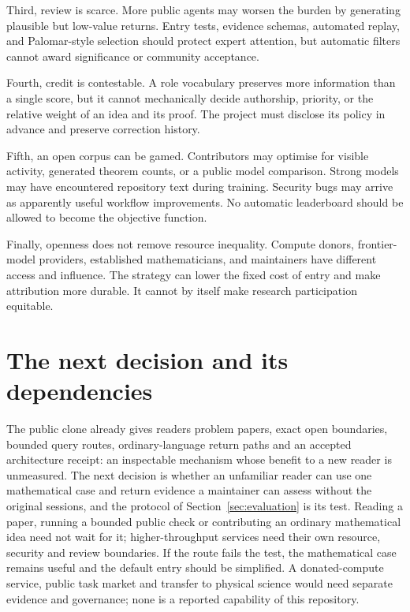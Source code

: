 \documentclass[10pt]{article}
\begin{document}
Third, review is scarce.  More public agents may worsen the burden by
generating plausible but low-value returns.  Entry tests, evidence schemas,
automated replay, and Palomar-style selection should protect expert attention,
but automatic filters cannot award significance or community acceptance.

Fourth, credit is contestable.  A role vocabulary preserves more information
than a single score, but it cannot mechanically decide authorship, priority,
or the relative weight of an idea and its proof.  The project must disclose
its policy in advance and preserve correction history.

Fifth, an open corpus can be gamed.  Contributors may optimise for visible
activity, generated theorem counts, or a public model comparison.  Strong
models may have encountered repository text during training.  Security bugs
may arrive as apparently useful workflow improvements.  No automatic
leaderboard should be allowed to become the objective function.

Finally, openness does not remove resource inequality.  Compute donors,
frontier-model providers, established mathematicians, and maintainers have
different access and influence.  The strategy can lower the fixed cost of
entry and make attribution more durable.  It cannot by itself make research
participation equitable.

\section{The next decision and its dependencies}\label{sec:execution}

The public clone already gives readers problem papers, exact open boundaries,
bounded query routes, ordinary-language return paths and an accepted
architecture receipt: an inspectable mechanism whose benefit to a new reader is
unmeasured. The next decision is whether an unfamiliar reader can use one
mathematical case and return evidence a maintainer can assess without the
original sessions, and the protocol of Section~\ref{sec:evaluation} is its
test. Reading a paper, running a bounded public check or contributing an
ordinary mathematical idea need not wait for it; higher-throughput services
need their own resource, security and review boundaries. If the route fails
the test, the mathematical case remains useful and the default entry should be
simplified. A donated-compute service, public task market and transfer to
physical science would need separate evidence and governance; none is a
reported capability of this repository.
\end{document}
